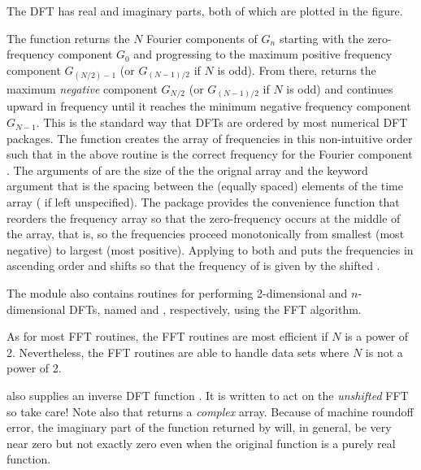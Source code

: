 \documentclass[letterpaper,10pt,english]{sphinxmanual}
\begin{document}
The DFT has real and imaginary parts, both of which are plotted in the figure.

The  function returns the $N$ Fourier components of $G_n$ starting with the zero-frequency component $G_0$ and progressing to the maximum positive frequency component $G_{(N/2)-1}$ (or $G_{(N-1)/2}$ if $N$ is odd).  From there,  returns the maximum \emph{negative} component $G_{N/2}$  (or $G_{(N-1)/2}$ if $N$ is odd) and continues upward in frequency until it reaches the minimum negative frequency component $G_{N-1}$.  This is the standard way that DFTs are ordered by most numerical DFT packages.  The  function  creates the array of frequencies in this non-intuitive order such that  in the above routine is the correct frequency for the Fourier component .  The arguments of  are the size of the the orignal array  and the keyword argument  that is the spacing between the (equally spaced) elements of the time array ( if left unspecified).  The package  provides the convenience function  that reorders the frequency array so that the zero-frequency occurs at the middle of the array, that is, so the frequencies proceed monotonically from smallest (most negative) to largest (most positive).  Applying  to both  and  puts the frequencies  in ascending order and shifts  so that the frequency of  is given by the shifted .

The  module also contains routines for performing 2-dimensional and $n$-dimensional DFTs, named  and , respectively, using the FFT algorithm.

As for most FFT routines, the  FFT routines are most efficient if $N$ is a power of 2.  Nevertheless, the FFT routines are able to handle data sets where $N$ is not a power of 2.

 also supplies an inverse DFT function .  It is written to act on the \emph{unshifted} FFT so take care!  Note also that  returns a \emph{complex} array.  Because of machine roundoff error, the imaginary part of the function returned by  will, in general, be very near zero but not exactly zero even when the original function is a purely real function.

\end{document}
